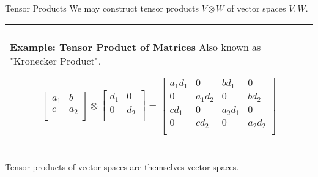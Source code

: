 \documentclass[11pt]{beamer}
\newenvironment{boxed2}
    {\begin{center}
    \begin{tabular}{|p{0.95\textwidth}|}
    \hline\\
    }
    { 
    \\\\\hline
    \end{tabular} 
    \end{center}
    }
\begin{document}
\begin{frame}{Tensor Products}
We may construct tensor products $V\otimes W$ of vector spaces $V,W$.
\begin{boxed2}
	
	\vspace{-.57cm}
	
	\textbf{Example: Tensor Product of Matrices} Also known as "Kronecker Product".
	
	
	\vspace{-.12cm}
	
	$$
	\begin{bmatrix}
		a_1&b\\
		c&a_2\\
	\end{bmatrix}
	\otimes 
	\begin{bmatrix}
		d_1&0\\
		0&d_2\\
	\end{bmatrix}
	=\begin{bmatrix}
		a_1d_1&0&bd_1&0\\
		0&a_1d_2&0&bd_2\\
		cd_1&0 &a_2d_1 &0\\
		0&cd_2&0&a_2d_2\\
	\end{bmatrix}
	$$
	
	\vspace{-.3cm}
	
\end{boxed2}

Tensor products of vector spaces are themselves vector spaces.
\end{frame}
\end{document}

